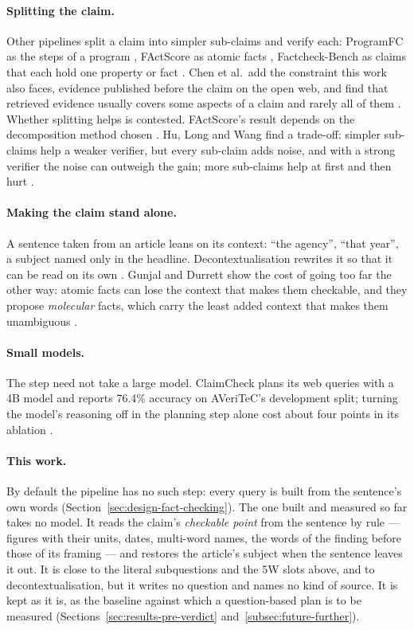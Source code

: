 \paragraph{Splitting the claim.} Other pipelines split a claim into
simpler sub-claims and verify each: ProgramFC as the steps of a program
\cite{pan2023programfc}, FActScore as atomic facts
\cite{min2023factscore}, Factcheck-Bench as claims that each hold one
property or fact \cite{wang2024factcheckbench}. Chen et al.\ add the
constraint this work also faces, evidence published before the claim on
the open web, and find that retrieved evidence usually covers some
aspects of a claim and rarely all of them \cite{chen2024wild}. Whether
splitting helps is contested. FActScore's result depends on the
decomposition method chosen \cite{wanner2024closer}. Hu, Long and Wang
find a trade-off: simpler sub-claims help a weaker verifier, but every
sub-claim adds noise, and with a strong verifier the noise can outweigh
the gain; more sub-claims help at first and then hurt
\cite{hu2025decomposition}.

\paragraph{Making the claim stand alone.} A sentence taken from an
article leans on its context: ``the agency'', ``that year'', a subject
named only in the headline. Decontextualisation rewrites it so that it
can be read on its own \cite{choi2021decontextualization}. Gunjal and
Durrett show the cost of going too far the other way: atomic facts can
lose the context that makes them checkable, and they propose
\emph{molecular} facts, which carry the least added context that makes
them unambiguous \cite{gunjal2024molecular}.

\paragraph{Small models.} The step need not take a large model.
ClaimCheck plans its web queries with a 4B model and reports 76.4\%
accuracy on AVeriTeC's development split; turning the model's reasoning
off in the planning step alone cost about four points in its ablation
\cite{putta2025claimcheck}.

\paragraph{This work.} By default the pipeline has no such step: every
query is built from the sentence's own words
(Section~\ref{sec:design-fact-checking}). The one built and measured so
far takes no model. It reads the claim's \emph{checkable point} from the
sentence by rule --- figures with their units, dates, multi-word names,
the words of the finding before those of its framing --- and restores
the article's subject when the sentence leaves it out. It is close to
the literal subquestions and the 5W slots above, and to
decontextualisation, but it writes no question and names no kind of
source. It is kept as it is, as the baseline against which a
question-based plan is to be measured
(Sections~\ref{sec:results-pre-verdict} and~\ref{subsec:future-further}).
